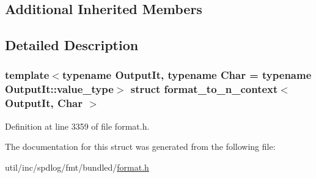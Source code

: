 \subsection*{Additional Inherited Members}


\subsection{Detailed Description}
\subsubsection*{template$<$typename Output\+It, typename Char = typename Output\+It\+::value\+\_\+type$>$\newline
struct format\+\_\+to\+\_\+n\+\_\+context$<$ Output\+It, Char $>$}



Definition at line 3359 of file format.\+h.



The documentation for this struct was generated from the following file\+:\begin{DoxyCompactItemize}
\item 
util/inc/spdlog/fmt/bundled/\hyperlink{format_8h}{format.\+h}\end{DoxyCompactItemize}
